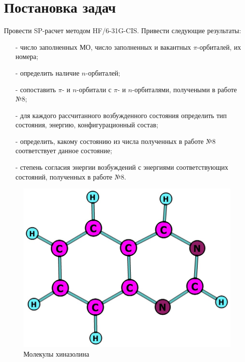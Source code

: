 \section{Постановка задач}
Провести SP-расчет методом HF/6-31G-CIS. Привести следующие результаты:
\begin{itemize}
    \item[-] число заполненных МО, число заполненных и вакантных $\pi$-орбиталей, их номера;
    \item[-] определить наличие $n$-орбиталей;
    \item[-] сопоставить $\pi$- и $n$-орбитали с $\pi$- и $n$-орбиталями, получеными в работе №8;
    \item[-] для каждого рассчитанного возбужденного состояния определить тип состояния, энергию, конфигурационный состав;
    \item[-] определить, какому состоянию из числа полученных в работе №8 соответствует данное состояние;
    \item[-] степень согласия энергии возбуждений с энергиями соответствующих состояний, полученных в работе №8.  
\end{itemize}

\begin{figure}[H]
\centering
\captionsetup{justification=centering}
\includegraphics[scale=0.4]{fig/1.jpg}
\caption{Молекулы хиназолина}
\end{figure}